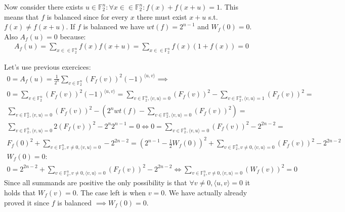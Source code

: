 \documentclass[12pt, a4paper]{article}
\begin{document}
Now consider there exists $u \in \mathbb{F}^n_2: \forall x \in \in \mathbb{F}^n_2: f(x)+f(x+u)=1$. This means that $f$ is balanced since for every $x$ there must exist $x+u$ s.t. $f(x) \neq f(x+u)$. If $f$ is balanced we have $wt(f)=2^{n-1}$ and $W_f(0)=0$. Also $A_f(u)=0$ because:
\begin{gather*}
A_f(u)=\sum\limits_{x \in \in \mathbb{F}^n_2} f(x)f(x+u) = \sum\limits_{x \in \in \mathbb{F}^n_2} f(x)(1+f(x)) = 0
\end{gather*}

Let's use previous exercices:
\begin{gather*}
0=A_f(u)= \frac{1}{2^n} \sum\limits_{v  \in \mathbb{F}^n_2} (F_f(v))^2 (-1)^{\langle u,v \rangle} \implies \\
0 = \sum\limits_{v  \in \mathbb{F}^n_2} (F_f(v))^2 (-1)^{\langle u,v \rangle} = \sum\limits_{v  \in \mathbb{F}^n_2, \langle v,u \rangle = 0} (F_f(v))^2 - \sum\limits_{v  \in \mathbb{F}^n_2, \langle v,u \rangle = 1} (F_f(v))^2 =\\
\sum\limits_{v  \in \mathbb{F}^n_2, \langle v,u \rangle = 0} (F_f(v))^2 - \left(2^n wt(f) - \sum\limits_{v  \in \mathbb{F}^n_2, \langle v,u \rangle = 0} (F_f(v))^2 \right) =\\
\sum\limits_{v  \in \mathbb{F}^n_2, \langle v,u \rangle = 0} 2(F_f(v))^2 - 2^n2^{n-1} = 0 \iff 0 = \sum\limits_{v  \in \mathbb{F}^n_2, \langle v,u \rangle = 0} (F_f(v))^2 - 2^{2n-2} =\\
F_f(0)^2 + \sum\limits_{v  \in \mathbb{F}^n_2, v \neq 0, \langle v,u \rangle = 0} - 2^{2n-2} = (2^{n-1}-\frac{1}{2}W_f(0))^2 + \sum\limits_{v  \in \mathbb{F}^n_2, v \neq 0, \langle v,u \rangle = 0}(F_f(v))^2 - 2^{2n-2}\\
\text{$W_f(0) = 0$:}\\
0 = 2^{2n-2} + \sum\limits_{v  \in \mathbb{F}^n_2, v \neq 0, \langle v,u \rangle = 0}(F_f(v))^2 - 2^{2n-2} \iff \sum\limits_{v  \in \mathbb{F}^n_2, v \neq 0, \langle v,u \rangle = 0}(W_f(v))^2 = 0
\end{gather*}
Since all summands are positive the only possibility is that $\forall v \neq 0, \langle u,v \rangle = 0$ it holds that $W_f(v)=0$. The case left is when $v=0$. We have actually already proved it since $f$ is balanced $\implies W_f(0)=0$. 
\end{document}
